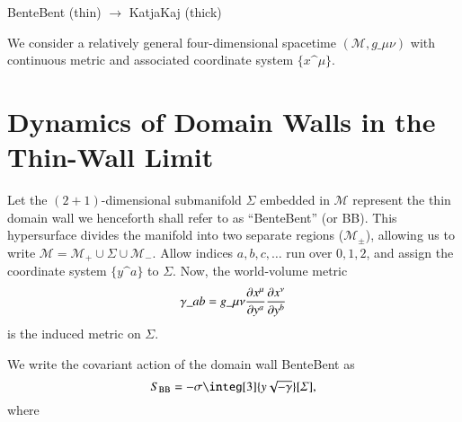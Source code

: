 


\begin{bullets}
    \item BenteBent (thin) $\to$ KatjaKaj (thick)
\end{bullets}

We consider a relatively general four-dimensional spacetime $(\mathscr{M}, g\_{\mu\nu})$ with continuous metric and associated coordinate system $\{x\^\mu \}$. \blahblah \citep{ishibashiEquationMotionDomain1999} 


\section{Dynamics of Domain Walls in the Thin-Wall Limit}
{

Let the $(2+1)$-dimensional submanifold $\varSigma$ embedded in $\mathscr{M}$ represent the thin domain wall we henceforth shall refer to as ``BenteBent'' (or BB). This hypersurface divides the manifold into two separate regions ($\mathscr{M}_{\pm}$), allowing us to write $\mathscr{M} = \mathscr{M}_+ \cup  \varSigma  \cup \mathscr{M}_-$. Allow indices $a,b,c,\dots$ run over $0,1,2$, and assign the coordinate system $\{y\^a\}$ to $\varSigma$. Now, the world-volume metric
\begin{equation}
    \gamma\_{ab} = g\_{\mu\nu} \pdv{x\^\mu}{y\^a}  \pdv{x\^\nu}{y\^b}
\end{equation}
is the induced metric on $\varSigma$.  \citep{carrollSpacetimeGeometryIntroduction2019}



We write the covariant action of the domain wall BenteBent as
\begin{equation}
    S\ped{BB}  = -\sigma \integ[3]{y\sqrt{-\gamma}}[\varSigma],
\end{equation}
where 





}